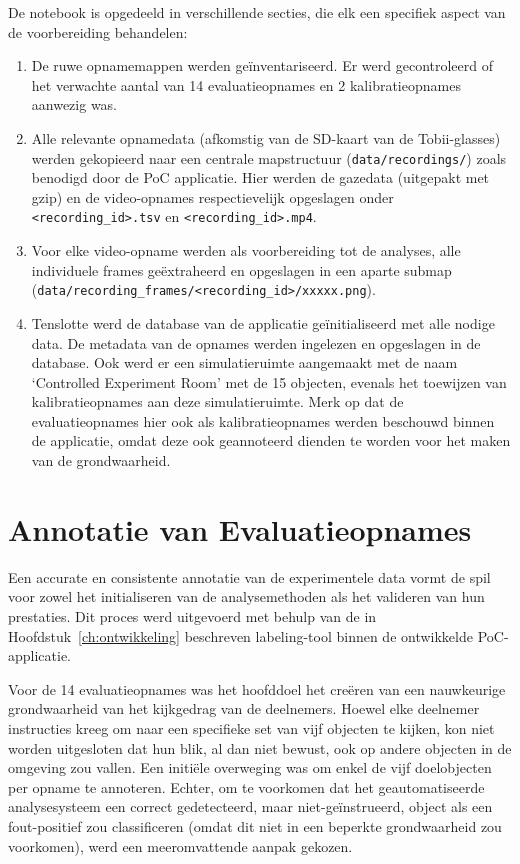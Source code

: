 De notebook is opgedeeld in verschillende secties, die elk een specifiek aspect van de voorbereiding behandelen:
\begin{enumerate}
    \item De ruwe opnamemappen werden geïnventariseerd. Er werd gecontroleerd of het verwachte aantal van 14 evaluatieopnames 
    en 2 kalibratieopnames aanwezig was.
    \item Alle relevante opnamedata (afkomstig van de SD-kaart van de Tobii-glasses) werden gekopieerd naar een centrale 
    mapstructuur (\texttt{data/recordings/}) zoals benodigd door de PoC applicatie.
    Hier werden de gazedata (uitgepakt met gzip) en de video-opnames respectievelijk opgeslagen onder \texttt{<recording\_id>.tsv} 
    en \texttt{<recording\_id>.mp4}.
    \item Voor elke video-opname werden als voorbereiding tot de analyses, alle individuele frames geëxtraheerd en opgeslagen 
    in een aparte submap (\texttt{data/recording\_frames/<recording\_id>/xxxxx.png}).
    \item Tenslotte werd de database van de applicatie geïnitialiseerd met alle nodige data. De metadata van de opnames werden 
    ingelezen en opgeslagen in de database.
    Ook werd er een simulatieruimte aangemaakt met de naam `Controlled Experiment Room' met de 15 objecten, evenals het toewijzen 
    van kalibratieopnames aan deze simulatieruimte.
    Merk op dat de evaluatieopnames hier ook als kalibratieopnames werden beschouwd binnen de applicatie, omdat deze ook geannoteerd 
    dienden te worden voor het maken van de grondwaarheid.
\end{enumerate}

\section{Annotatie van Evaluatieopnames}

Een accurate en consistente annotatie van de experimentele data vormt de spil voor zowel het 
initialiseren van de analysemethoden als het valideren van hun prestaties. 
Dit proces werd uitgevoerd met behulp van de in Hoofdstuk~\ref{ch:ontwikkeling} beschreven labeling-tool binnen de ontwikkelde PoC-applicatie. 

Voor de 14 evaluatieopnames was het hoofddoel het creëren van een nauwkeurige grondwaarheid van het kijkgedrag van de deelnemers. 
Hoewel elke deelnemer instructies kreeg om naar een specifieke set van vijf objecten te kijken, kon niet worden uitgesloten dat hun blik, 
al dan niet bewust, ook op andere objecten in de omgeving zou vallen. 
Een initiële overweging was om enkel de vijf doelobjecten per opname te annoteren. 
Echter, om te voorkomen dat het geautomatiseerde analysesysteem een correct gedetecteerd, maar niet-geïnstrueerd, 
object als een fout-positief zou classificeren (omdat dit niet in een beperkte grondwaarheid zou voorkomen), 
werd een meeromvattende aanpak gekozen.

